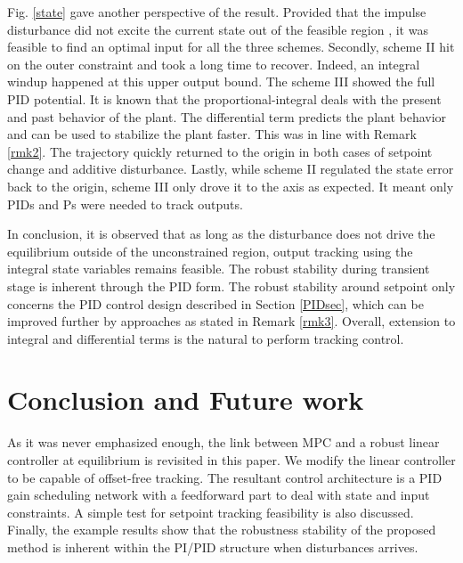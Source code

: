 \documentclass[5p,authoryear,times]{elsarticle}
\begin{document}
Fig. \ref{state} gave another perspective of the result. Provided that the impulse disturbance did not excite the current state out of the feasible region , it was feasible to find an optimal input for all the three schemes. Secondly, scheme II hit on the outer constraint  and took a long time to recover. Indeed, an integral windup happened at this upper output bound. The scheme III showed the full PID potential. It is known that the proportional-integral deals with the present and past behavior of the plant. The differential term predicts the plant behavior and can be used to stabilize the plant faster. This was in line with Remark \ref{rmk2}. The trajectory quickly returned to the origin in both cases of setpoint change and additive disturbance. Lastly, while scheme II regulated the state error back to the origin, scheme III only drove it to the axis  as expected. It meant only  PIDs and  Ps were needed to track  outputs.

In conclusion, it is observed that as long as the disturbance does not drive the equilibrium outside of the unconstrained region, output tracking using the integral state variables remains feasible. The robust stability during transient stage is inherent through the PID form. The robust stability around setpoint only concerns the PID control design described in Section \ref{PIDsec}, which can be improved further by  approaches as stated in Remark \ref{rmk3}. Overall, extension to integral and differential terms is the natural to perform tracking control.

\section{Conclusion and Future work}

As it was never emphasized enough, the link between MPC and a robust linear controller at equilibrium is revisited in this paper. We modify the linear controller to be capable of offset-free tracking. The resultant control architecture is a PID gain scheduling network with a feedforward part to deal with state and input constraints. A simple test for setpoint tracking feasibility is also discussed. Finally, the example results show that the robustness stability of the proposed method is inherent within the PI/PID structure when disturbances arrives.





\end{document}
